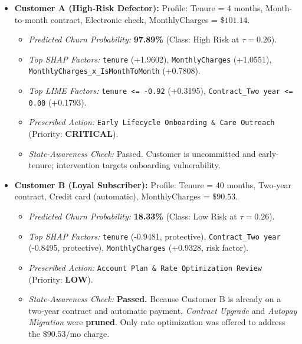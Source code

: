 \documentclass[conference]{IEEEtran}
\begin{document}
\begin{itemize}
    \item \textbf{Customer A (High-Risk Defector):} Profile: Tenure = 4 months, Month-to-month contract, Electronic check, MonthlyCharges = $\$101.14$.
    \begin{itemize}
        \item \textit{Predicted Churn Probability:} \textbf{97.89\%} (Class: High Risk at $\tau = 0.26$).
        \item \textit{Top SHAP Factors:} \texttt{tenure} (+1.9602), \texttt{MonthlyCharges} (+1.0551), \texttt{MonthlyCharges\_x\_IsMonthToMonth} (+0.7808).
        \item \textit{Top LIME Factors:} \texttt{tenure <= -0.92} (+0.3195), \texttt{Contract\_Two year <= 0.00} (+0.1793).
        \item \textit{Prescribed Action:} \texttt{Early Lifecycle Onboarding \& Care Outreach} (Priority: \textbf{CRITICAL}).
        \item \textit{State-Awareness Check:} Passed. Customer is uncommitted and early-tenure; intervention targets onboarding vulnerability.
    \end{itemize}
    \item \textbf{Customer B (Loyal Subscriber):} Profile: Tenure = 40 months, Two-year contract, Credit card (automatic), MonthlyCharges = $\$90.53$.
    \begin{itemize}
        \item \textit{Predicted Churn Probability:} \textbf{18.33\%} (Class: Low Risk at $\tau = 0.26$).
        \item \textit{Top SHAP Factors:} \texttt{tenure} (-0.9481, protective), \texttt{Contract\_Two year} (-0.8495, protective), \texttt{MonthlyCharges} (+0.9328, risk factor).
        \item \textit{Prescribed Action:} \texttt{Account Plan \& Rate Optimization Review} (Priority: \textbf{LOW}).
        \item \textit{State-Awareness Check:} \textbf{Passed.} Because Customer B is already on a two-year contract and automatic payment, \textit{Contract Upgrade} and \textit{Autopay Migration} were \textbf{pruned}. Only rate optimization was offered to address the $\$90.53/\text{mo}$ charge.
    \end{itemize}
\end{itemize}
\end{document}
